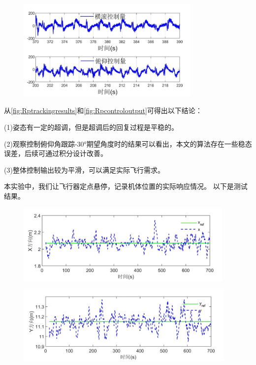 \documentclass[
  type=master
]{gdutthesis}
\begin{document}
\begin{figure}[htbp]
	\centering
	\includegraphics[width=0.8\textwidth]{屏幕截图 2022-04-06 151409.png}
	\label{fig:Rpcontroloutput}
\end{figure}

从\autoref{fig:Rptrackingresults}和\autoref{fig:Rpcontroloutput}可得出以下结论：

(1)姿态有一定的超调，但是超调后的回复过程是平稳的。

(2)观察控制俯仰角跟踪-30°期望角度时的结果可以看出，本文的算法存在一些稳态误差，后续可通过积分设计改善。

(3)整体控制输出较为平滑，可以满足实际飞行需求。

本实验中，我们让飞行器定点悬停，记录机体位置的实际响应情况。
以下是测试结果。
\begin{figure}[H]
	\centering
	\includegraphics[width=0.95\textwidth]{屏幕截图 2022-04-10 192550.png}
	\label{fig:xtrackingresults}
\end{figure}

\begin{figure}[H]
	\centering
	\includegraphics[width=0.96\textwidth]{屏幕截图 2022-04-10 193508.png}
	\label{fig:ytrackingresults}
\end{figure}
\end{document}
